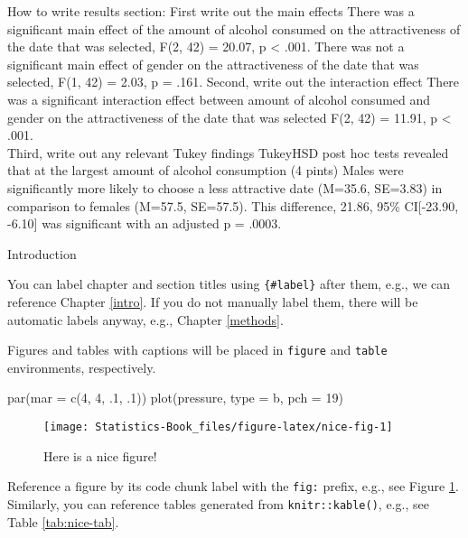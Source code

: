 \documentclass[
]{book}
\newenvironment{Shaded}{\begin{snugshade}}{\end{snugshade}}
\newcommand{\AttributeTok}[1]{\textcolor[rgb]{0.77,0.63,0.00}{#1}}
\newcommand{\DecValTok}[1]{\textcolor[rgb]{0.00,0.00,0.81}{#1}}
\newcommand{\FunctionTok}[1]{\textcolor[rgb]{0.00,0.00,0.00}{#1}}
\newcommand{\NormalTok}[1]{#1}
\newcommand{\StringTok}[1]{\textcolor[rgb]{0.31,0.60,0.02}{#1}}
\begin{document}
How to write results section:
First write out the main effects
There was a significant main effect of the amount of alcohol consumed on the
attractiveness of the date that was selected, F(2, 42) = 20.07, p \textless{} .001.
There was not a significant main effect of gender on the attractiveness of
the date that was selected, F(1, 42) = 2.03, p = .161.
Second, write out the interaction effect
There was a significant interaction effect between amount of alcohol consumed
and gender on the attractiveness of the date that was selected F(2, 42) = 11.91, p \textless{} .001.\\
Third, write out any relevant Tukey findings
TukeyHSD post hoc tests revealed that at the largest amount of alcohol consumption (4 pints) Males were significantly more likely to choose a less attractive date (M=35.6, SE=3.83) in comparison to females (M=57.5, SE=57.5). This difference, 21.86, 95\% CI{[}-23.90, -6.10{]} was significant with an adjusted p = .0003.

Introduction

You can label chapter and section titles using \texttt{\{\#label\}} after them, e.g., we can reference Chapter \ref{intro}. If you do not manually label them, there will be automatic labels anyway, e.g., Chapter \ref{methods}.

Figures and tables with captions will be placed in \texttt{figure} and \texttt{table} environments, respectively.

\begin{Shaded}
\begin{Highlighting}[]
\FunctionTok{par}\NormalTok{(}\AttributeTok{mar =} \FunctionTok{c}\NormalTok{(}\DecValTok{4}\NormalTok{, }\DecValTok{4}\NormalTok{, .}\DecValTok{1}\NormalTok{, .}\DecValTok{1}\NormalTok{))}
\FunctionTok{plot}\NormalTok{(pressure, }\AttributeTok{type =} \StringTok{\textquotesingle{}b\textquotesingle{}}\NormalTok{, }\AttributeTok{pch =} \DecValTok{19}\NormalTok{)}
\end{Highlighting}
\end{Shaded}

\begin{figure}

{\centering \texttt{[image: Statistics-Book\_files/figure-latex/nice-fig-1]} 

}

\caption{Here is a nice figure!}\label{fig:nice-fig}
\end{figure}

Reference a figure by its code chunk label with the \texttt{fig:} prefix, e.g., see Figure \ref{fig:nice-fig}. Similarly, you can reference tables generated from \texttt{knitr::kable()}, e.g., see Table \ref{tab:nice-tab}.
\end{document}

